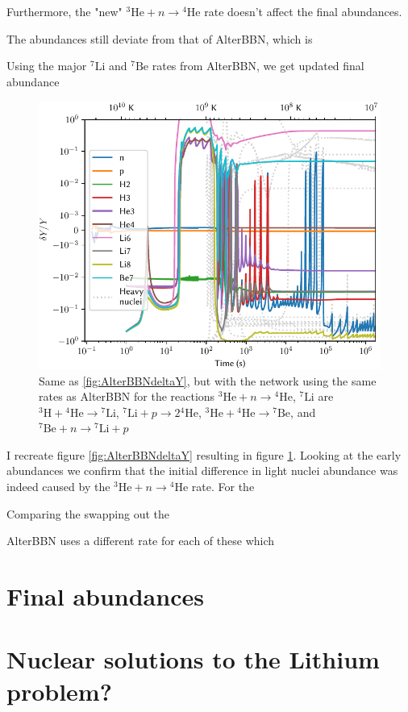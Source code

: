 Furthermore, the "new" ${}^3\text{He}+n\rightarrow {}^4\text{He}$ rate doesn't affect the final abundances. 


The abundances still deviate from that of AlterBBN, which is 


Using the major ${}^7\text{Li}$ and ${}^7\text{Be}$ rates from AlterBBN, we get updated final abundance


\begin{figure}[ht]
    \includegraphics[width=5.1in]{figures/AlterratesBBNdeltaY.pdf}
    \caption{Same as \cref{fig:AlterBBNdeltaY}, but with the network using the same rates as AlterBBN for the reactions ${}^3\text{He}+n\rightarrow {}^4\text{He}$, ${}^7\text{Li}$ are ${}^3\text{H}+{}^4\text{He}\rightarrow {}^7\text{Li}$, ${}^7\text{Li} + p\rightarrow 2{}^4\text{He}$, ${}^3\text{He}+{}^4\text{He}\rightarrow {}^7\text{Be}$, and ${}^7\text{Be} + n\rightarrow {}^7\text{Li} + p$}
    \label{fig:AlterratesBBNdeltaY}
\end{figure}




I recreate figure \ref{fig:AlterBBNdeltaY} resulting in figure \ref{fig:AlterratesBBNdeltaY}. Looking at the early abundances we confirm that the initial difference in light nuclei abundance was indeed caused by the ${}^3\text{He}+n\rightarrow {}^4\text{He}$ rate. For the 



Comparing the swapping out the 




AlterBBN uses a different rate for each of these which 




\section{Final abundances}



\section{Nuclear solutions to the Lithium problem?}